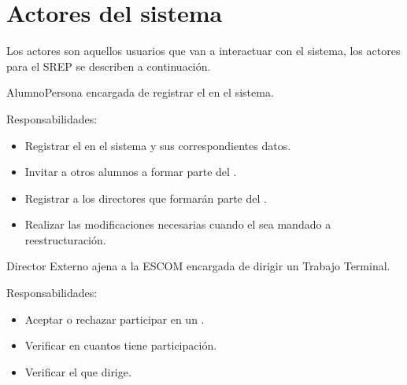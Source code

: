 \section{Actores del sistema}\label{sec:Comportamiento:ActoresSistema}

Los actores son aquellos usuarios que van a interactuar con el sistema, los actores para el SREP se describen a continuación.

\begin{actor}{Alumno}{Persona encargada de registrar el  en el sistema.} 
	\item[Responsabilidades:] \hspace{1pt}
	\begin{itemize}
		\item Registrar el  en el sistema y sus correspondientes datos.
		\item Invitar a otros alumnos a formar parte del .
		\item Registrar a los directores que formarán parte del .
		\item Realizar las modificaciones necesarias cuando el  sea mandado a reestructuración.
	\end{itemize}
\end{actor}


\begin{actor}{Director Externo}{ ajena a la ESCOM encargada de dirigir un Trabajo Terminal.} 
	\item[Responsabilidades:] \hspace{1pt}
	\begin{itemize}
		\item Aceptar o rechazar participar en un .
		\item Verificar en cuantos  tiene participación.
		\item Verificar el  que dirige.
	\end{itemize}
\end{actor}


